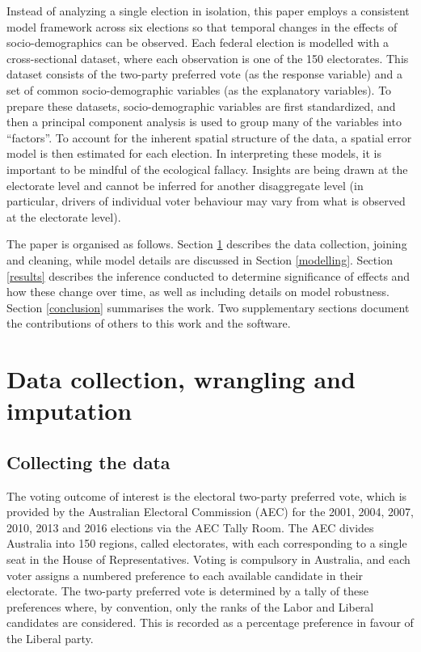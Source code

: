 \documentclass[times, doublespace]{anzsauth}
\begin{document}
Instead of analyzing a single election in isolation, this paper employs a consistent model framework across six elections so that temporal changes in the effects of socio-demographics can be observed. Each federal election is modelled with a cross-sectional dataset, where each observation is one of the 150 electorates. This dataset consists of the two-party preferred vote (as the response variable) and a set of common socio-demographic variables (as the explanatory variables). To prepare these datasets, socio-demographic variables are first standardized, and then a principal component analysis is used to group many of the variables into ``factors''. To account for the inherent spatial structure of the data, a spatial error model is then estimated for each election. In interpreting these models, it is important to be mindful of the ecological fallacy. Insights are being drawn at the electorate level and cannot be inferred for another disaggregate level (in particular, drivers of individual voter behaviour may vary from what is observed at the electorate level).

The paper is organised as follows. Section \ref{data} describes the data collection, joining and cleaning, while model details are discussed in Section \ref{modelling}. Section \ref{results} describes the inference conducted to determine significance of effects and how these change over time, as well as including details on model robustness. Section \ref{conclusion} summarises the work. Two supplementary sections document the contributions of others to this work and the software.

\hypertarget{data}{%
\section{Data collection, wrangling and imputation}\label{data}}

\hypertarget{collecting-the-data}{%
\subsection{Collecting the data}\label{collecting-the-data}}

The voting outcome of interest is the electoral two-party preferred vote, which is provided by the Australian Electoral Commission (AEC) for the 2001, 2004, 2007, 2010, 2013 and 2016 elections via the AEC Tally Room. The AEC divides Australia into 150 regions, called electorates, with each corresponding to a single seat in the House of Representatives. Voting is compulsory in Australia, and each voter assigns a numbered preference to each available candidate in their electorate. The two-party preferred vote is determined by a tally of these preferences where, by convention, only the ranks of the Labor and Liberal candidates are considered. This is recorded as a percentage preference in favour of the Liberal party.
\end{document}
